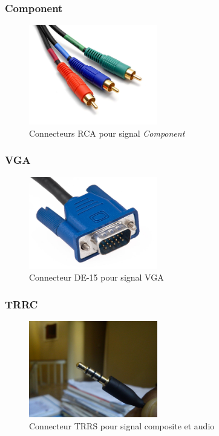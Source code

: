 \documentclass[
  french,
]{book}
\begin{document}
\hypertarget{component}{%
\subsubsection{Component}\label{component}}

\begin{figure}
\centering
\includegraphics[width=0.5\textwidth,height=\textheight]{medias/lexique/signaux/analogue/component.jpg}
\caption{Connecteurs RCA pour signal \emph{Component}}
\end{figure}

\hypertarget{vga}{%
\subsubsection{VGA}\label{vga}}

\begin{figure}
\centering
\includegraphics[width=0.5\textwidth,height=\textheight]{medias/lexique/signaux/analogue/vga.jpg}
\caption{Connecteur DE-15 pour signal VGA}
\end{figure}

\hypertarget{trrc}{%
\subsubsection{TRRC}\label{trrc}}

\begin{figure}
\centering
\includegraphics[width=0.5\textwidth,height=\textheight]{medias/lexique/signaux/analogue/3_5mm.jpg}
\caption{Connecteur TRRS pour signal composite et audio}
\end{figure}
\end{document}
